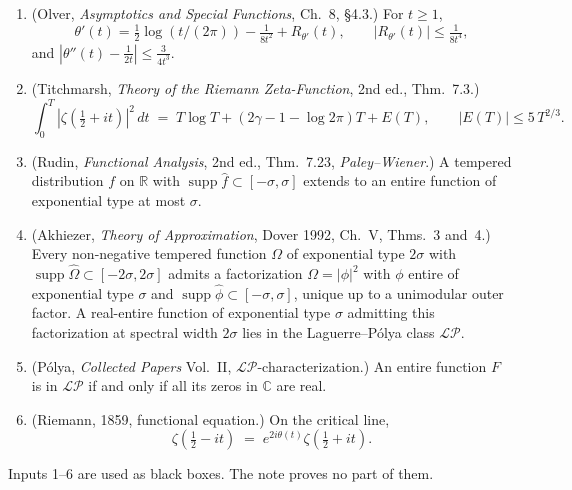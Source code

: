 \documentclass[11pt,a4paper]{article}
\theoremstyle{definition}
\DeclareMathOperator{\supp}{supp}
\newcommand{\C}{\mathbb{C}}
\newcommand{\R}{\mathbb{R}}
\newcommand{\LP}{\mathcal{LP}}
\begin{document}
\begin{enumerate}[label=\textbf{Input \arabic*.}, leftmargin=*]
\item (Olver, \emph{Asymptotics and Special Functions}, Ch.~8, \S4.3.) For $t \ge 1$,
\begin{equation}
  \theta'(t) = \tfrac12\log(t/(2\pi)) - \tfrac{1}{8t^2} + R_{\theta'}(t),
  \qquad |R_{\theta'}(t)| \le \tfrac{1}{8t^4},
\end{equation}
and $|\theta''(t)-\tfrac{1}{2t}| \le \tfrac{3}{4t^3}$.

\item (Titchmarsh, \emph{Theory of the Riemann Zeta-Function}, 2nd ed., Thm.~7.3.)
\begin{equation}
  \int_0^T|\zeta(\tfrac12+it)|^2\,dt \;=\; T\log T + (2\gamma - 1 - \log 2\pi)T + E(T),
  \qquad |E(T)| \le 5\,T^{2/3}.
  \label{eq:titchmarsh}
\end{equation}

\item (Rudin, \emph{Functional Analysis}, 2nd ed., Thm.~7.23, \emph{Paley--Wiener}.)
A tempered distribution $f$ on $\R$ with $\supp\widehat f\subset[-\sigma,\sigma]$
extends to an entire function of exponential type at most $\sigma$.

\item (Akhiezer, \emph{Theory of Approximation}, Dover 1992, Ch.~V, Thms.~3 and~4.)
Every non-negative tempered function $\Omega$ of exponential type $2\sigma$ with
$\supp\widehat\Omega\subset[-2\sigma,2\sigma]$ admits a factorization
$\Omega = |\phi|^2$ with $\phi$ entire of exponential type $\sigma$ and
$\supp\widehat\phi\subset[-\sigma,\sigma]$, unique up to a unimodular outer factor.
A real-entire function of exponential type $\sigma$ admitting this factorization at
spectral width $2\sigma$ lies in the Laguerre--P\'olya class $\LP$.

\item (P\'olya, \emph{Collected Papers} Vol.~II, $\LP$-characterization.)
An entire function $F$ is in $\LP$ if and only if all its zeros in $\C$ are real.

\item (Riemann, 1859, functional equation.) On the critical line,
\begin{equation}
  \zeta(\tfrac12 - it) \;=\; e^{2i\theta(t)}\zeta(\tfrac12 + it).
  \label{eq:FE}
\end{equation}
\end{enumerate}

Inputs 1--6 are used as black boxes. The note proves no part of them.
\end{document}

